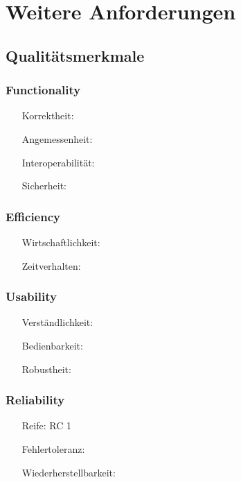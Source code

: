 \chapter{Weitere Anforderungen}

\section{Qualitätsmerkmale}



\subsection{Functionality}
\begin{itemize}
	\item[Korrektheit:] 
	\item[Angemessenheit:] 
	\item[Interoperabilität:] 
	\item[Sicherheit:] 
\end{itemize}

\subsection{Efficiency}
\begin{itemize}
	\item[Wirtschaftlichkeit:] 
	\item[Zeitverhalten:] 
\end{itemize}

\subsection{Usability}
\begin{itemize}
	\item[Verständlichkeit:] 
	\item[Bedienbarkeit:] 
	\item[Robustheit:]
\end{itemize}

\subsection{Reliability}
\begin{itemize}
	\item[Reife:] RC 1
	\item[Fehlertoleranz:] 
	\item[Wiederherstellbarkeit:] 
\end{itemize}

